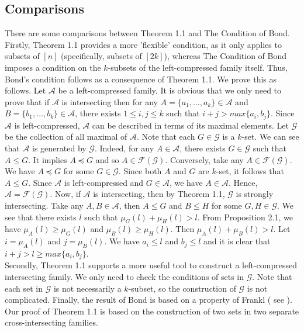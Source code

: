 \documentclass[reqno,english]{amsart}
\theoremstyle{plain}
\theoremstyle{remark}
\newcommand{\0}[0]{\emptyset}
\renewcommand{\1}[0]{\textbf{1}}
\theoremstyle{plain}
\theoremstyle{remark}
\renewcommand{\1}[0]{\textbf{1}}
\begin{document}
\subsection{Comparisons}
{There are some comparisons between Theorem 1.1 and The Condition of Bond. Firstly, Theorem 1.1 provides a more 'flexible' condition, as it only applies to subsets of 
$[n]$ (specifically, subsets of 
$[2k]$), whereas The Condition of Bond imposes a condition on the 
$k$-subsets of the left-compressed family itself. Thus, Bond’s condition follows as a consequence of Theorem 1.1. We prove this as follows. Let $\mathcal{A}$ be a left-compressed family. It is obvious that we only need to prove that if $\mathcal{A}$ is intersecting then for any $A=\{a_{1},\ldots,a_{k}\} \in \mathcal{A}$ and $B=\{b_{1},\ldots,b_{k}\} \in \mathcal{A}$, there exists $1 \leq i,j \leq k$ such that $i+j > max \{a_{i},b_{j}\}$. Since $\mathcal{A}$ is left-compressed, $\mathcal{A}$ can be described in terms of its maximal elements. Let $\mathcal{G}$ be the collection of all maximal of $\mathcal{A}$. Note that each $G \in \mathcal{G}$ is a $k$-set. We can see that $\mathcal{A}$ is generated by $\mathcal{G}$. Indeed, for any $A \in \mathcal{A}$, there exists $G \in \mathcal{G}$ such that $A \leq G$. It implies $A \preceq G$ and so $A \in  \mathcal{F}(\mathcal{G})$. Conversely, take any $A \in \mathcal{F}(\mathcal{G})$. We have $A \preceq G$ for some $G \in \mathcal{G}$. Since both $A$ and $G$ are $k$-set, it follows that $A \leq G$. Since $\mathcal{A}$ is left-compressed and $G \in \mathcal{A}$, we have $A \in \mathcal{A}$. Hence, $\mathcal{A}=\mathcal{F}(\mathcal{G})$. Now, if $\mathcal{A}$ is intersecting, then by Theorem 1.1, $\mathcal{G}$ is strongly intersecting. Take any $A,B \in \mathcal{A}$, then $A \leq G$ and $B \leq H$ for some $G,H \in \mathcal{G}$. We see that there exists $l$ such that $\mu_{G}(l)+\mu_{H}(l) >l$. From Proposition 2.1, we have $\mu_{A}(l) \geq \mu_{G}(l)$ and $\mu_{B}(l) \geq \mu_{H}(l)$. Then $\mu_{A}(l)+\mu_{B}(l) > l$. Let $i=\mu_{A}(l)$ and $j=\mu_{B}(l)$. We have $a_{i} \leq l$ and $b_{j} \leq l$ and it is clear that $i+j > l \geq max\{a_{i},b_{j}\}$.\\
Secondly, Theorem 1.1 supports a more useful tool to construct a left-compressed intersecting family. We only need to check the conditions of sets in $\mathcal{G}$. Note that each set in $\mathcal{G}$ is not necessarily a $k$-subset, so the construction of $\mathcal{G}$ is not complicated. Finally, the result of Bond is based on a property of Frankl ( see \cite{Fr87}). Our proof of Theorem 1.1 is based on the construction of two sets in two separate cross-intersecting families.}\\
\end{document}

